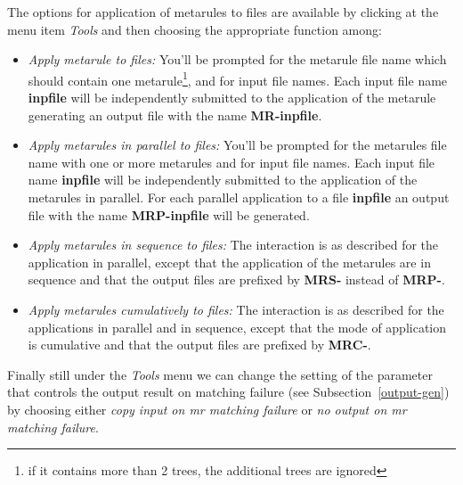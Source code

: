 The options for application of metarules to files are available by clicking
at the menu item {\it Tools} and then choosing the appropriate function
among:

\begin{itemize}
\item   {\it Apply metarule to files:}  
        You'll be prompted for the metarule file name
        which should contain one metarule\footnote{if it contains more than 
        2 trees, the additional trees are ignored}, and for input file names.
        Each input file name {\bf inpfile} will be independently submitted to 
        the application of the metarule generating an output file with the 
        name    {\bf MR-inpfile}.

\item   {\it Apply metarules in parallel to files:}
        You'll be prompted for the metarules file name with one or more 
        metarules and for input file names.
        Each input file name {\bf inpfile} will be independently submitted to 
        the application of the metarules in parallel. For each parallel 
        application to a file {\bf inpfile} an output file with the 
        name    {\bf MRP-inpfile} will be generated.

\item   {\it Apply metarules in sequence to files:}  
        The interaction is as described for the application in parallel, 
        except that
        the application of the metarules are in sequence and that 
        the output files are prefixed by {\bf MRS-} instead of {\bf MRP-}.

\item   {\it Apply metarules cumulatively to files:}  
        The interaction is as described for the applications in parallel
        and in sequence, except that the mode of application is cumulative
        and that the output files are prefixed by {\bf MRC-}.
\end{itemize}


Finally still under the {\it Tools} menu we can change the setting of the 
parameter that controls the output result on matching failure 
(see Subsection~\ref{output-gen})
by choosing
either {\it copy input on mr matching failure} or 
{\it no output on mr matching failure}.
